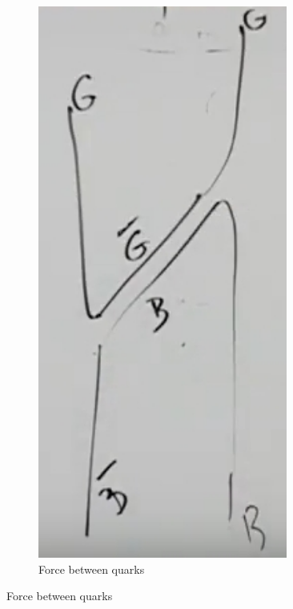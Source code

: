 \documentclass[]{article}
\begin{document}
\begin{figure}[H]
	\caption{Photons cannot exchange photons, but gluons can exchange gluons.}\label{fig:quarks:gluons:forces}
	\begin{subfigure}{0.45\textwidth}
		\caption{Force between quarks}
		\includegraphics[width=0.9\textwidth]{2-2-gluon7}

\end{subfigure}
\end{figure}
\end{document}
